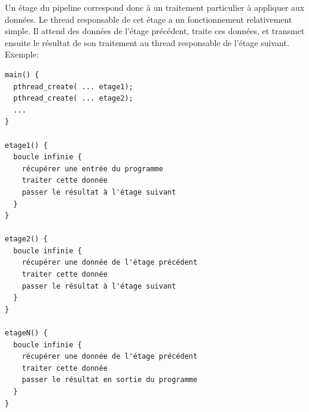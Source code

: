 Un étage du pipeline correspond donc à un traitement particulier à appliquer aux données. Le thread responsable de cet étage a un fonctionnement relativement simple. Il attend des données de l'étage précédent, traite ces données, et transmet ensuite le résultat de son traitement au thread responsable de l'étage suivant.
\newpage
Exemple:

\begin{lstlisting}[frame=trBL]
main() {
  pthread_create( ... etage1);
  pthread_create( ... etage2);
  ...
}

etage1() {
  boucle infinie {
    récupérer une entrée du programme
    traiter cette donnée
    passer le résultat à l'étage suivant
  }
}

etage2() {
  boucle infinie {
    récupérer une donnée de l'étage précédent
    traiter cette donnée
    passer le résultat à l'étage suivant
  }
}

etageN() {
  boucle infinie {
    récupérer une donnée de l'étage précédent
    traiter cette donnée
    passer le résultat en sortie du programme
  }
}
\end{lstlisting}
